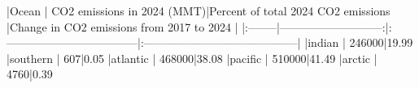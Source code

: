 |Ocean    | CO2 emissions in 2024 (MMT)|Percent of total 2024 CO2 emissions |Change in CO2 emissions from 2017 to 2024 |
|:--------|---------------------------:|:-----------------------------------|:-----------------------------------------|
|indian   |                      246000|19.99%
|southern |                         607|0.05%
|atlantic |                      468000|38.08%
|pacific  |                      510000|41.49%
|arctic   |                        4760|0.39%
